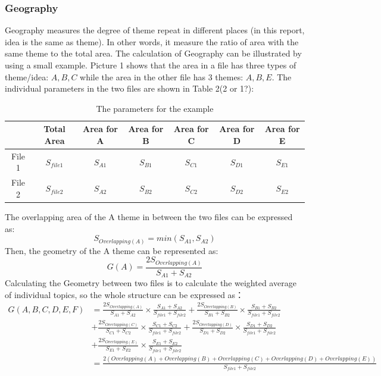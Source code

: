 \subsubsection*{Geography}
Geography measures the degree of theme repeat in different places (in this report, idea is the same as theme). In other words, it measure the ratio of area with the same theme to the total area. The calculation of Geography can be illustrated by using a small example. Picture 1 shows that the area in a file has three types of theme/idea: $A,B,C$ while the area in the other file has 3 themes: $A,B,E$. The individual parameters in the two files are shown in Table 2(2 or 1?):
\begin{table}[H]
\centering
\caption{The parameters for the example}
\label{tab:my-table}
\begin{tabular}{|c|c|c|c|c|c|c|}
\hline
       & Total Area & Area for A & Area for B & Area for C & Area for D & Area for E \\ \hline
File 1 &    $S_{file1}$       &     $S_{A1}$       &    $S_{B1}$          &       $S_{C1}$       &           $S_{D1}$   &    $S_{E1}$          \\ \hline
File 2 &   $S_{file2}$         &    $S_{A2}$        &     $S_{B2}$       &   $S_{C2}$     &       $S_{D2}$     &    $S_{E2}$        \\ \hline
\end{tabular}
\end{table}
The overlapping area of the A theme in between the two files can be expressed as:
$$
S_{Overlapping(A)}=min(S_{A1},S_{A2})
$$
Then, the geometry of the A theme can be represented as:
$$
G(A) = \frac{2S_{Overlapping(A)}}{S_{A1}+S_{A2}}
$$
Calculating the Geometry between two files is to calculate the weighted average of individual topics, so the whole structure can be expressed as：
\begin{equation}
    \begin{split}
        G(A,B,C,D,E,F) & =  {\frac{2S_{Overlapping(A)}}{S_{A1}+S_{A2}}} \times {\frac{S_{A1}+S_{A2}}{S_{file1}+S_{file2}}} +
        {\frac{2S_{Overlapping(B)}}{S_{B1}+S_{B2}}} \times {\frac{S_{B1}+S_{B2}}{S_{file1}+S_{file2}}}\\
        & + {\frac{2S_{Overlapping(C)}}{S_{C1}+S_{C2}}} \times {\frac{S_{C1}+S_{C2}}{S_{file1}+S_{file2}}} +
        {\frac{2S_{Overlapping(D)}}{S_{D1}+S_{D2}}} \times {\frac{S_{D1}+S_{D2}}{S_{file1}+S_{file2}}}\\
        &+ {\frac{2S_{Overlapping(E)}}{S_{E1}+S_{E2}}} \times {\frac{S_{E1}+S_{E2}}{S_{file1}+S_{file2}}}\\
        & = \frac{2(Overlapping(A)+Overlapping(B)+Overlapping(C)+Overlapping(D)+Overlapping(E))}{S_{file1}+S_{file2}}
    \end{split}
\end{equation}
